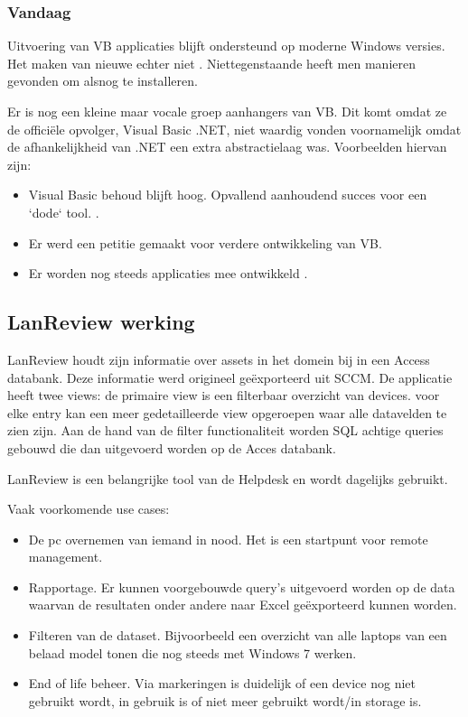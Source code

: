 \subsubsection{Vandaag}

Uitvoering van VB applicaties blijft ondersteund op moderne Windows versies. Het maken van nieuwe echter niet \autocite{MicrosoftDocs2018}. Niettegenstaande heeft men manieren gevonden om alsnog te installeren. \autocite{Brust2015}

Er is nog een kleine maar vocale groep aanhangers van VB. Dit komt omdat ze de officiële opvolger, Visual Basic .NET, niet waardig vonden voornamelijk omdat de afhankelijkheid van .NET een extra abstractielaag was. Voorbeelden hiervan zijn: %
\begin{itemize}
    \item Visual Basic behoud blijft hoog. Opvallend aanhoudend succes voor een `dode` tool. \autocite{ISpliter2014}.
    \item Er werd een petitie gemaakt voor verdere ontwikkeling van VB. \autocite{2005}
    \item Er worden nog steeds applicaties mee ontwikkeld \autocite{Ippolito2018}.
\end{itemize}

\subsection{LanReview werking}


LanReview houdt zijn informatie over assets in het domein bij in een Access databank. Deze informatie werd origineel geëxporteerd uit SCCM.
De applicatie heeft twee views: de primaire view is een filterbaar overzicht van devices. voor elke entry kan een meer gedetailleerde view opgeroepen waar alle datavelden te zien zijn.
Aan de hand van de filter functionaliteit worden SQL achtige queries gebouwd die dan uitgevoerd worden op de Acces databank.

LanReview is een belangrijke tool van de Helpdesk en wordt dagelijks gebruikt.

Vaak voorkomende use cases:
\begin{itemize}
    \item De pc overnemen van iemand in nood. Het is een startpunt voor remote management.
    \item Rapportage. Er kunnen voorgebouwde query's uitgevoerd worden op de data waarvan de resultaten onder andere naar Excel geëxporteerd kunnen worden.
    \item Filteren van de dataset. Bijvoorbeeld een overzicht van alle laptops van een belaad model tonen die nog steeds met Windows 7 werken.
    \item End of life beheer. Via markeringen is duidelijk of een device nog niet gebruikt wordt, in gebruik is of niet meer gebruikt wordt/in storage is.
\end{itemize}

